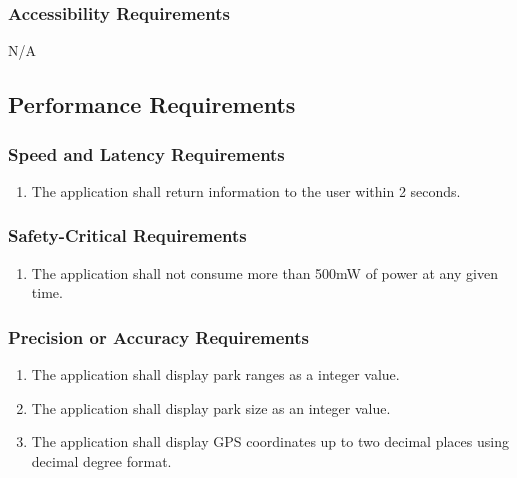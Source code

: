 \documentclass[titlepage]{article}
\newcounter{myCounter}
\begin{document}
\subsubsection{Accessibility Requirements}
\label{ssub:accessibility_requirements}
N/A


\subsection{Performance Requirements}
\label{sub:performance_requirements}
\setcounter{myCounter}{0}

\subsubsection{Speed and Latency Requirements}
\label{ssub:speed_and_latency_requirements}
\begin{enumerate}[{PR}1. ]
    \setcounter{enumi}{\themyCounter}
	\item The application shall return information to the user within 2 seconds.
    \setcounter{myCounter}{\theenumi}
\end{enumerate}

\subsubsection{Safety-Critical Requirements}
\label{ssub:safety_critical_requirements}
\begin{enumerate}[{PR}1. ]
    \setcounter{enumi}{\themyCounter}
	\item The application shall not consume more than 500mW of power at any given time.
    \setcounter{myCounter}{\theenumi}
\end{enumerate}

\subsubsection{Precision or Accuracy Requirements}
\label{ssub:precision_or_accuracy_requirements}
\begin{enumerate}[{PR}1. ]
    \setcounter{enumi}{\themyCounter}
	\item The application shall display park ranges as a integer value. 
	\item The application shall display park size as an integer value. 
    \item The application shall display GPS coordinates up to two decimal places using decimal
    degree format. 
	\setcounter{myCounter}{\theenumi}
\end{enumerate}
\end{document}
